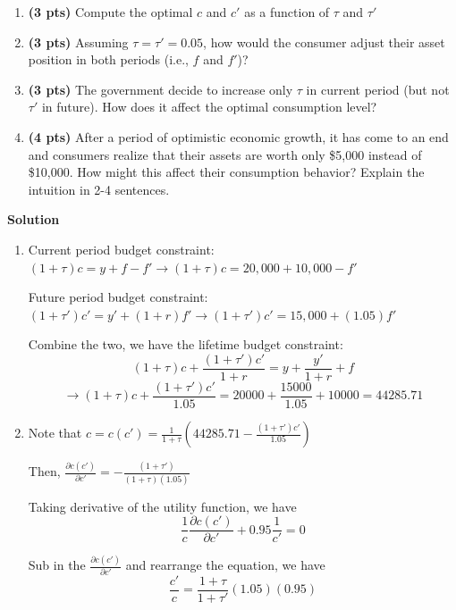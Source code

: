 \documentclass[addpoints,12pt,answers]{exam}
\begin{document}
\begin{enumerate}[label=\textbf{\arabic*.}, itemsep=15pt]
\begin{enumerate}[label=(\alph*)]
			\item \textbf{(3  pts)} Compute the optimal $c$ and $c'$ as a function of $\tau$ and $\tau'$
			
			\item \textbf{(3  pts)} Assuming \(\tau = \tau' = 0.05\), how would the consumer adjust their asset position in both periods (i.e., \(f\) and \(f'\))?
			
			\item \textbf{(3  pts)} The government decide to increase only $\tau$ in current period (but not $\tau'$ in future). How does it affect the optimal consumption level? 
			
			\item \textbf{(4  pts)} After a period of optimistic economic growth, it has come to an end and consumers realize that their assets are worth only \$5,000 instead of \$10,000. How might this affect their consumption behavior? Explain the intuition in 2-4 sentences.
			
			\vspace{1cm}
			
			
			
		\end{enumerate}
		
		\vfill
		
		\newpage
		
		\textbf{Solution}
		\begin{enumerate}
			\item Current period budget constraint: $(1+\tau)c = y+f-f' \to (1+\tau)c = 20,000+10,000-f'$
			
			Future period budget constraint: $(1+\tau')c'= y'+(1+r)f' \to (1+\tau')c'= 15,000+(1.05)f'$
			
			Combine the two, we have the lifetime budget constraint:
			\[(1+\tau)c +\frac{(1+\tau')c'}{1+r} = y + \frac{y'}{1+r} +f\]
			\[\to (1+\tau)c +\frac{(1+\tau')c'}{1.05} = 20000 + \frac{15000}{1.05} +10000 = 44285.71\]
			\item
			Note that $c=c(c') = \frac{1}{1+\tau}\left(44285.71 - \frac{(1+\tau')c'}{1.05} \right)$
			
			Then, $\frac{\partial c(c')}{\partial c'} = - \frac{(1+\tau')}{(1+\tau) (1.05)} $
			
			Taking derivative of the utility function, we have
			\[\frac{1}{c} \frac{\partial c(c')}{\partial c'} + 0.95 \frac{1}{c'} = 0  \]
			
			Sub in the $\frac{\partial c(c')}{\partial c'}$ and rearrange the equation, we have 
			 \[\frac{c'}{c} = \frac{1+\tau}{1+\tau'} (1.05)(0.95)\]
			 

\end{enumerate}
\end{enumerate}
\end{document}
